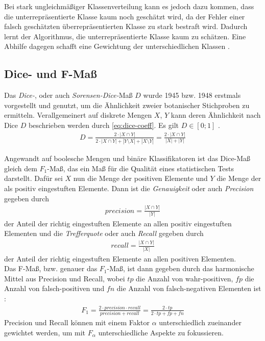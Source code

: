 Bei stark ungleichmäßiger Klassenverteilung kann es jedoch dazu kommen, 
dass die unterrepräsentierte Klasse kaum noch geschätzt wird, 
da der Fehler einer falsch geschätzten überrepräsentierten Klasse zu stark bestraft wird.
Dadurch lernt der Algorithmus, die unterrepräsentierte Klasse kaum zu schätzen.
Eine Abhilfe dagegen schafft eine Gewichtung der unterschiedlichen Klassen \cite[S.~4]{Ronneberger.18052015}.

\subsection{Dice- und F-Maß}

Das \textit{Dice-}, oder auch \textit{Sorensen-Dice-}Maß $D$ wurde 1945 bzw. 1948 erstmals vorgestellt und genutzt, um die Ähnlichkeit zweier botanischer Stichproben zu ermitteln. Verallgemeinert auf diskrete Mengen $X$, $Y$ kann deren Ähnlichkeit nach Dice $D$ beschrieben werden durch \autoref{eq:dice-coeff}. Es gilt $D \in [0; 1]$ \cites[S.~33]{Srenson.1948}[S.~297]{Dice.1945}. 
\begin{align}
	\label{eq:dice-coeff} D = \frac{2 \cdot | X \cap Y |}{2 \cdot | X \cap Y | + |Y \setminus X| + |X \setminus Y|} 
	=\frac{2 \cdot | X \cap Y |}{|X| + |Y|}
\end{align} 

Angewandt auf boolesche Mengen und binäre Klassifikatoren ist das Dice-Maß gleich dem $F_1$-Maß, das ein Maß für die Qualität eines statistischen Tests darstellt. Dafür sei $X$ nun die Menge der positiven Elemente und $Y$ die Menge der als positiv eingestuften Elemente. Dann ist die \textit{Genauigkeit} oder auch \textit{Precision} gegeben durch
\begin{align}
	\label{eq:precision} precision = \frac{|X \cap Y|}{|Y|}
\end{align}
der Anteil der richtig eingestuften Elemente an allen positiv eingestuften Elementen und die \textit{Trefferquote} oder auch \textit{Recall} gegeben durch
\begin{align}
	\label{eq:recall} recall = \frac{|X \cap Y|}{|X|}
\end{align}
der Anteil der richtig eingestuften Elemente an allen positiven Elementen. \\
Das F-Maß, bzw. genauer das $F_1$-Maß, ist dann gegeben durch das harmonische Mittel aus Precision und Recall, wobei $tp$ die Anzahl von wahr-positiven, $fp$ die Anzahl von falsch-positiven und $fn$ die Anzahl von falsch-negativen Elementen ist \cite{YutakaSasaki.2007}:
\begin{align}
	\label{eq:f1} F_{1} = \frac{2\cdot precision \cdot recall}{precision + recall} = \frac{2\cdot tp}{2 \cdot tp + fp + fn}
\end{align}
Precision und Recall können mit einem Faktor $\alpha$ unterschiedlich zueinander gewichtet werden, um mit $F_{\alpha}$ unterschiedliche Aspekte zu fokussieren. 

